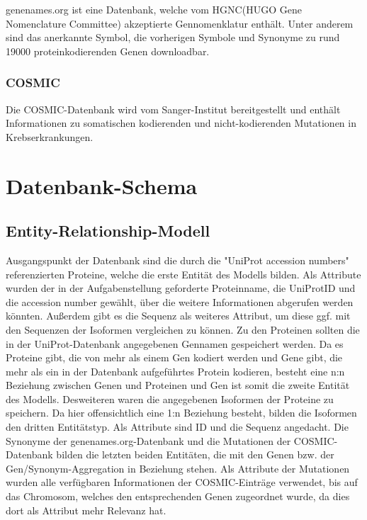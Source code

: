 \documentclass{scrartcl}
\begin{document}
genenames.org ist eine Datenbank, welche vom HGNC(HUGO Gene Nomenclature Committee) akzeptierte Gennomenklatur enthält. Unter anderem sind das anerkannte Symbol, die vorherigen Symbole und Synonyme zu rund 19000 proteinkodierenden Genen downloadbar.

\subsubsection{COSMIC}

Die COSMIC-Datenbank wird vom Sanger-Institut bereitgestellt und enthält Informationen zu somatischen kodierenden und nicht-kodierenden Mutationen in Krebserkrankungen.

\section{Datenbank-Schema}

\subsection{Entity-Relationship-Modell}

Ausgangspunkt der Datenbank sind die durch die "UniProt accession numbers" referenzierten Proteine, welche die erste Entität des Modells bilden. Als Attribute wurden der in der Aufgabenstellung geforderte Proteinname, die UniProtID und die accession number gewählt, über die weitere Informationen abgerufen werden könnten. Außerdem gibt es die Sequenz als weiteres Attribut, um diese ggf. mit den Sequenzen der Isoformen vergleichen zu können.
   Zu den Proteinen sollten die in der UniProt-Datenbank angegebenen Gennamen gespeichert werden. Da es Proteine gibt, die von mehr als einem Gen kodiert werden und Gene gibt, die mehr als ein in der Datenbank aufgeführtes Protein kodieren, besteht eine n:n Beziehung zwischen Genen und Proteinen und Gen ist somit die zweite Entität des Modells.
   Desweiteren waren die angegebenen Isoformen der Proteine zu speichern. Da hier offensichtlich eine 1:n Beziehung besteht, bilden die Isoformen den dritten Entitätstyp. Als Attribute sind ID und die Sequenz angedacht.
   Die Synonyme der genenames.org-Datenbank und die Mutationen der COSMIC-Datenbank bilden die letzten beiden Entitäten, die mit den Genen bzw. der Gen/Synonym-Aggregation in Beziehung stehen. Als Attribute der Mutationen wurden alle verfügbaren Informationen der COSMIC-Einträge verwendet, bis auf das Chromosom, welches den entsprechenden Genen zugeordnet wurde, da dies dort als Attribut mehr Relevanz hat.
\end{document}

